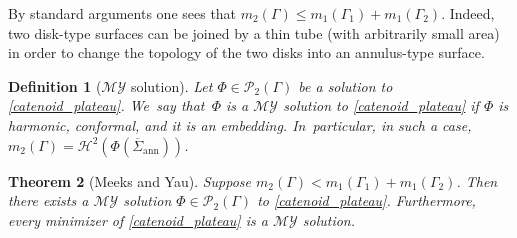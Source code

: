 \documentclass[11pt]{article}
\numberwithin{equation}{section}
\newcommand{\immclosedann}{\Phi({\overline\Sigma}_\mathrm{ann})}
\newtheorem{theorem}{Theorem}[section]
\newtheorem{definition}[theorem]{Definition}
\theoremstyle{definition}
\begin{document}
By standard arguments one sees that $m_2(\Gamma)\le m_1(\Gamma_1)+m_1(\Gamma_2)$. Indeed, two disk-type surfaces can be joined by a thin tube (with arbitrarily small area) in order to change the topology of the two disks into an annulus-type surface.

\begin{definition}[$\mathcal{MY}$ solution]\label{def:MY_solution}
Let $\Phi\in\mathcal{P}_2(\Gamma)$ be a solution to \eqref{catenoid_plateau}. We~say that~$\Phi$ is a $\mathcal{MY}$ solution to \eqref{catenoid_plateau} if
$\Phi$ is harmonic, conformal, and it is an embedding. In~particular, in such a case, $m_2(\Gamma)=\mathcal{H}^2(\immclosedann)$.
\end{definition}
\begin{theorem}[Meeks and Yau]\label{myexistence}
Suppose $m_2(\Gamma)<m_1(\Gamma_1)+m_1(\Gamma_2)$. Then there exists a $\mathcal{MY}$ solution $\Phi\in\mathcal{P}_2(\Gamma)$ to \eqref{catenoid_plateau}. Furthermore, every minimizer of \eqref{catenoid_plateau} is a $\mathcal{MY}$ solution.
\end{theorem}
\end{document}
